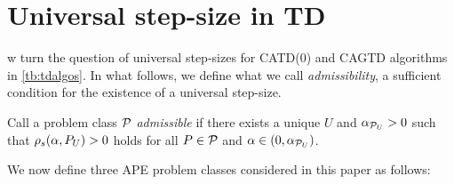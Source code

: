 
\section{Universal step-size in TD}
w turn the question of universal step-sizes for CATD(0) and CAGTD algorithms in \eqref{tb:tdalgos}. In what follows, we define what we call \emph{admissibility},  a sufficient condition for the existence of a universal step-size. 
\begin{definition}\label{def:admis}
Call a problem class $\P$ \emph{admissible} if there exists a unique $U$ and $\alpha_{\P_U}>0$ such that
$\rhos{P_U}>0$ holds for all $P\in \P$ and $\alpha\in(0,\alpha_{\P_U})$.
\end{definition}
We now define three APE problem classes considered in this paper as follows:
\begin{comment}
\begin{table}
\resizebox{\columnwidth}{!}{
\begin{tabular}{|c|c|c|c|}\hline
Class &Fixed &Variable &Remark\\\hline
$\P_{TDON}$ & $\Phi,S,A,\gamma$ & $\pi,P,R$ &$\mu=d_{\pi}, \EE{\phi_t\phi_t}=\EE{\phi'_t\phi'_t}$\\\hline
$\P_{TDOFF}$ & $\Phi,S,A,\gamma$ & $\pi,\mu,P,R$ &$\mu\neq d_{\pi}, \EE{\phi_t\phi_t}=\EE{\phi'_t\phi'_t}$, $\norm{\phi_t}=1$\\\hline
$\P_{GTDOFF}$ & $\Phi,S,A,\gamma$ & $\pi,\mu,P,R$ &$\mu\neq d_{\pi}$\\\hline
\end{tabular}
}
\end{table}
\end{comment}
\begin{table}
\end{table}

